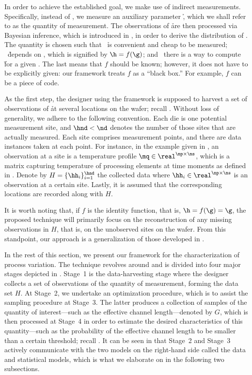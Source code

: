 In order to achieve the established goal, we make use of indirect measurements.
Specifically, instead of \g, we measure an auxiliary parameter \h, which we
shall refer to as the quantity of measurement. The observations of \h are then
processed via Bayesian inference, which is introduced in
, in order to derive the distribution of \g. The
quantity \h is chosen such that \one~\h is convenient and cheap to be measured;
\two~\h depends on \g, which is signified by $\h = f(\g)$; and \three~there is a
way to compute \h for a given \g. The last means that $f$ should be known;
however, it does not have to be explicitly given: our framework treats $f$ as a
``black box.'' For example, $f$ can be a piece of code.

As the first step, the designer using the framework is supposed to harvest a set
of observations of \h at several locations on the wafer; recall
. Without loss of generality, we adhere to the following
convention. Each die is one potential measurement site, and $\hnd < \nd$ denotes
the number of those sites that are actually measured. Each site comprises \np
measurement points, and there are \ns data instances taken at each point. For
instance, in the example given in , an observation at a
site is a temperature profile $\mq \in \real^{\np \times \ns}$, which is a
matrix capturing temperature of \np processing elements at \ns time moments as
defined in . Denote by $H = \{ \hh_i \}_{i =
1}^{\hnd}$ the collected data where $\hh_i \in \real^{\np \times \ns}$ is an
observation at a certain site. Lastly, it is assumed that the corresponding
locations are recorded along with $H$.

It is worth noting that, if $f$ is the identity function, that is, $\h = f(\g) =
\g$, the proposed technique will primarily focus on the reconstruction of any
missing observations in $H$, that is, on the unobserved sites on the wafer. From
this standpoint, our approach is a generalization of those developed in
\cite{zhang2010, reda2009}.

In the rest of this section, we present our framework for the characterization
of process variation. The technique revolves around  and is
divided into four major stages depicted in . Stage~1 is
the data-harvesting stage where the designer collects a set of observations of
the quantity of measurement, forming the data set $H$. At Stage~2, we undertake
an optimization procedure, which is to assist the sampling procedure at Stage~3.
The latter produces a collection of samples of the quantity of interest---such
as the effective channel length---denoted by $G$, which is then processed at
Stage~4 in order to estimate the desired characteristics of this quantity---such
as the probability of the effective channel length to be smaller than a certain
threshold; recall . It can be seen in
 that Stage~2 and Stage~3 actively communicate with the
two models on the right-hand side called the data and statistical models, which
is what we elaborate on in the following two subsections.


